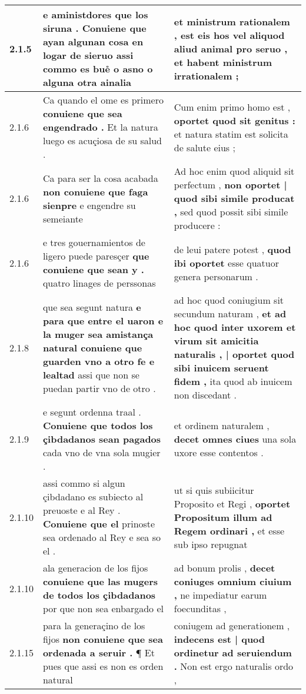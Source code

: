 \begin{tabular}{|p{1cm}|p{6.5cm}|p{6.5cm}|}
2.1.5 & e aministdores que los siruna . \textbf{ Conuiene que ayan algunan cosa en logar de sieruo } assi commo es bue̊ o asno o alguna otra ainalia & et ministrum rationalem , \textbf{ est eis hos vel aliquod aliud animal pro seruo , } et habent ministrum irrationalem ; \\\hline
2.1.6 & Ca quando el ome es primero \textbf{ conuiene que sea engendrado . } Et la natura luego es acuçiosa de su salud . & Cum enim primo homo est , \textbf{ oportet quod sit genitus : } et natura statim est solicita de salute eius ; \\\hline
2.1.6 & Ca para ser la cosa acabada \textbf{ non conuiene que faga sienpre } e engendre su semeiante & Ad hoc enim quod aliquid sit perfectum , \textbf{ non oportet | quod sibi simile producat , } sed quod possit sibi simile producere : \\\hline
2.1.6 & e tres gouernamientos de ligero puede paresçer \textbf{ que conuiene que sean y . } quatro linages de perssonas & de leui patere potest , \textbf{ quod ibi oportet } esse quatuor genera personarum . \\\hline
2.1.8 & que sea segunt natura \textbf{ e para que entre el uaron e la muger sea amistança natural conuiene que guarden vno a otro fe e lealtad } assi que non se puedan partir vno de otro . & ad hoc quod coniugium sit secundum naturam , \textbf{ et ad hoc quod inter uxorem et virum sit amicitia naturalis , | oportet quod sibi inuicem seruent fidem , } ita quod ab inuicem non discedant . \\\hline
2.1.9 & e segunt ordenna traal . \textbf{ Conuiene que todos los çibdadanos sean pagados } cada vno de vna sola mugier . & et ordinem naturalem , \textbf{ decet omnes ciues } una sola uxore esse contentos . \\\hline
2.1.10 & assi commo si algun çibdadano es subiecto al preuoste e al Rey . \textbf{ Conuiene que el } prinoste sea ordenado al Rey e sea so el . & ut si quis subiicitur Proposito et Regi , \textbf{ oportet Propositum illum ad Regem ordinari , } et esse sub ipso repugnat \\\hline
2.1.10 & ala generacion de los fijos \textbf{ conuiene que las mugers de todos los çibdadanos } por que non sea enbargado el & ad bonum prolis , \textbf{ decet coniuges omnium ciuium , } ne impediatur earum foecunditas , \\\hline
2.1.15 & para la generaçino de los fijos \textbf{ non conuiene que sea ordenada a seruir . } ¶ Et pues que assi es non es orden natural & coniugem ad generationem , \textbf{ indecens est | quod ordinetur ad seruiendum . } Non est ergo naturalis ordo , \\\hline

\end{tabular}
